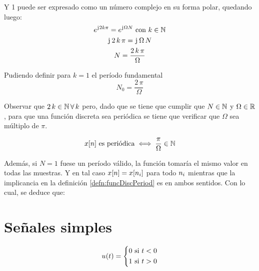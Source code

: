 Y 1 puede ser expresado como un número complejo en su forma polar, quedando luego:
\begin{gather*}
    e^{\iu 2 k \pi} = e^{\iu \Omega N} \text{ con $k \in \setN$}
    \\
    \iu \, 2 \, k \, \pi = \iu \, \Omega \, N
    \\
    N = \frac{2 \, k \, \pi}{\Omega}
\end{gather*}

Pudiendo definir para $k=1$ el período fundamental
\begin{equation*}
    N_0 = \frac{2 \, \pi}{\Omega}
\end{equation*}

Observar que $2 \, k \in \setN \, \forall \, k$ pero, dado que se tiene que cumplir que $N \in \setN$ y $\Omega \in \setR$, para que una función discreta sea periódica se tiene que verificar que $\Omega$ sea múltiplo de $\pi$.

\begin{mdframed}[style=PropertyFrame]
    \begin{prop}
    \end{prop}
    \begin{equation*}
        x[n] \text{ es periódica} \iff \frac{\pi}{\Omega} \in \setN
    \end{equation*}
\end{mdframed}

Además, si $N=1$ fuese un período válido, la función tomaría el mismo valor en todas las muestras.
Y en tal caso $x[n] = x[n_\ith]$ para todo $n_\ith$ mientras que la implicancia en la definición \ref{defn:funcDiscPeriod} es en ambos sentidos.
Con lo cual, se deduce que:

\begin{mdframed}[style=PropertyFrame]
    \begin{prop}
    \end{prop}
\end{mdframed}

\section{Señales simples}


\begin{equation*}
    \fx[u]{t} =
    \left\{
    \begin{aligned}
        0 \text{ si $t<0$}
        \\
        1 \text{ si $t>0$}
    \end{aligned}
    \right.
\end{equation*}

